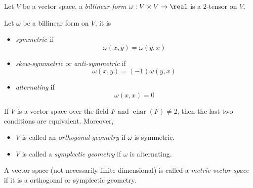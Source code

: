 \documentclass[../main-v2-manifolds.tex]{subfiles}
\begin{document}
    \begin{definition}
        Let $V$ be a vector space, a \emph{billinear form} $\omega: V\times V\to \real$ is a $2$-tensor on $V$.
    \end{definition}
    
    \begin{definition}
        Let $\omega$ be a billinear form on $V$, it is 
        \begin{itemize}
            \item \emph{symmetric} if 
            \[
                \omega(x,y) = \omega(y,x)
            \]
            \item \emph{skew-symmetric} or \emph{anti-symmetric} if 
            \[
                \omega(x,y) = (-1)\omega(y,x)
            \]
            \item \emph{alternating} if
            \[
                \omega(x,x)=0
            \]
        \end{itemize}
        If $V$ is a vector space over the field $F$ and $\operatorname{char}(F)\neq 2$, then the last two conditions are equivalent. Moreover, 
        \begin{itemize}
            \item $V$ is called an \emph{orthogonal geometry} if $\omega$ is symmetric.
            \item $V$ is called a \emph{symplectic geometry} if $\omega$ is alternating.
        \end{itemize}
    \end{definition}

    \begin{definition}
        A vector space (not necessarily finite dimensional) is called a \emph{metric vector space} if it is a orthogonal or symplectic geometry.
    \end{definition}


\end{document}
